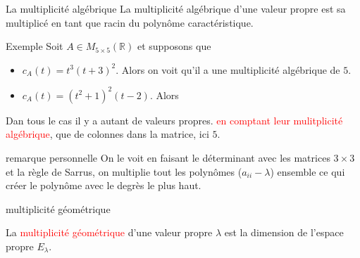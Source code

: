 \begin{parag}{La multiplicité algébrique}
    La multiplicité algébrique d'une valeur propre est sa multiplicé en tant que racin du polynôme caractéristique.
    \begin{subparag}{Exemple}
        Soit $A \in M_{5 \times 5}(\mathbb{R})$ et supposons que 
        \begin{itemize}
            \item $c_A(t) = t^3(t + 3)^2$. Alors on voit qu'il a une multiplicité algébrique de $5$.
            \item $c_A(t) = (t^2 + 1)^2(t-2)$. Alors
        \end{itemize}
        Dan tous le cas il y a autant de valeurs propres. \textcolor{red}{en comptant leur mulitplicité algébrique}, que de colonnes dans la matrice, ici $5$.
        \end{subparag}

        \begin{subparag}{remarque personnelle}
            On le voit en faisant le déterminant avec les matrices $3 \times 3$ et la règle de Sarrus, on multiplie tout les polynômes ($a_{ii} - \lambda$) ensemble ce qui créer le polynôme avec le degrès le plus haut.
        \end{subparag}
        
        \begin{subparag}{multiplicité géométrique}
        \begin{definition}
            La \textcolor{red}{multiplicité géométrique} d'une valeur propre $\lambda$ est la dimension de l'espace propre $E_\lambda$.
        \end{definition}
    \end{subparag}
\end{parag}

